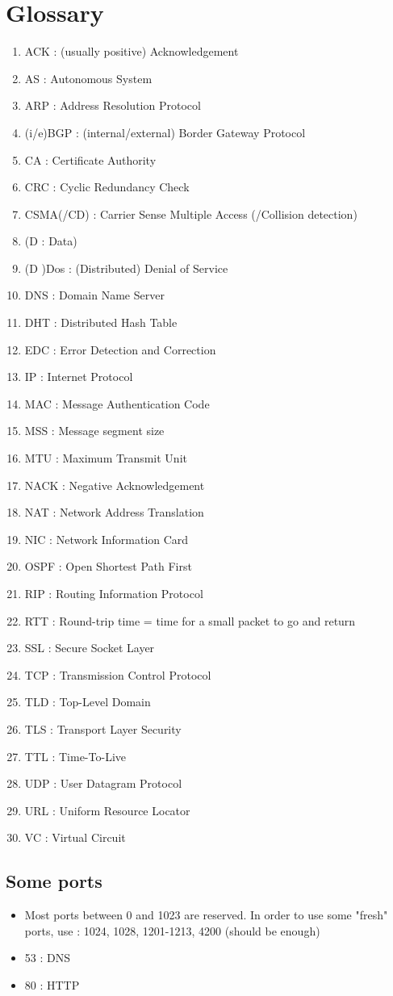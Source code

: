 \documentclass[12pt,a4paper]{article}
\begin{document}
\section{Glossary}
\begin{multicols}{2}
\begin{enumerate}
	\item 	ACK : (usually positive) Acknowledgement
	\item 	AS : Autonomous System
	\item 	ARP : Address Resolution Protocol
	\item	(i/e)BGP : (internal/external) Border Gateway Protocol
	\item 	CA : Certificate Authority
	\item 	CRC : Cyclic Redundancy Check
	\item 	CSMA(/CD) : Carrier Sense Multiple Access (/Collision detection)
	\item 	(D : Data)
	\item 	(D	)Dos : (Distributed) Denial of Service
	\item 	DNS : Domain Name Server
	\item 	DHT : Distributed Hash Table
	\item 	EDC : Error Detection and Correction
	\item 	IP : Internet Protocol
	\item 	MAC : Message Authentication Code
	\item 	MSS : Message segment size
	\item 	MTU : Maximum Transmit Unit
	\item 	NACK : Negative Acknowledgement
	\item 	NAT  : Network Address Translation
	\item 	NIC : Network Information Card
	\item 	OSPF : Open Shortest Path First
	\item 	RIP : Routing Information Protocol
	\item 	RTT : Round-trip time = time for a small packet to go and return
	\item 	SSL : Secure Socket Layer
	\item 	TCP : Transmission Control Protocol
	\item 	TLD : Top-Level Domain
	\item 	TLS : Transport Layer Security
	\item 	TTL : Time-To-Live
	\item 	UDP : User Datagram Protocol
	\item 	URL : Uniform Resource Locator
	\item 	VC  : Virtual Circuit
\end{enumerate}
\end{multicols}

\subsection{Some ports}
\begin{itemize}
	\item 	Most ports between 0 and 1023 are reserved. In order to use some "fresh" ports, use : 1024, 1028, 1201-1213, 4200 (should be enough) 
	\item 	53 : DNS
	\item 	80 : HTTP 	
\end{itemize}
\end{document}
